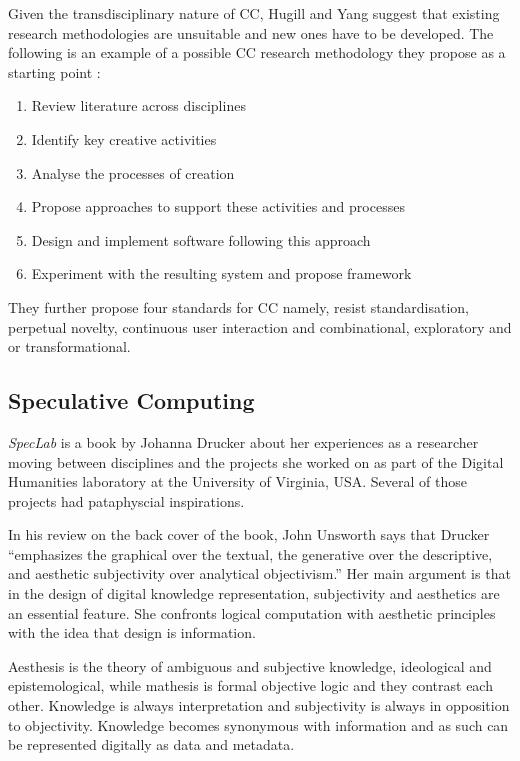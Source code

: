 Given the transdisciplinary nature of \ac{CC}, Hugill and Yang suggest that existing research methodologies are unsuitable and new ones have to be developed. The following is an example of a possible \ac{CC} research methodology they propose as a starting point \autocite[p.17]{Hugill2013c}:

\begin{enumerate}
  \item Review literature across disciplines
  \item Identify key creative activities
  \item Analyse the processes of creation
  \item Propose approaches to support these activities and processes
  \item Design and implement software following this approach
  \item Experiment with the resulting system and propose framework
\end{enumerate}

They further propose four standards for \ac{CC} \citeyear[p.17]{Hugill2013c} namely, resist standardisation, perpetual novelty, continuous user interaction and combinational, exploratory and or transformational.


\subsection{Speculative Computing}

\textit{SpecLab} is a book by Johanna Drucker \citeyear{Drucker2009} about her experiences as a researcher moving between disciplines and the projects she worked on as part of the Digital Humanities laboratory at the University of Virginia, USA\@. Several of those projects had pataphyscial inspirations.

In his review on the back cover of the book, John Unsworth says that Drucker ``emphasizes the graphical over the textual, the generative over the descriptive, and aesthetic subjectivity over analytical objectivism.'' Her main argument is that in the design of digital knowledge representation, subjectivity and aesthetics are an essential feature. She confronts logical computation with aesthetic principles with the idea that design is information.

Aesthesis is the theory of ambiguous and subjective knowledge, ideological and epistemological, while mathesis is formal objective logic and they contrast each other. Knowledge is always interpretation and subjectivity is always in opposition to objectivity. Knowledge becomes synonymous with information and as such can be represented digitally as data and metadata.

